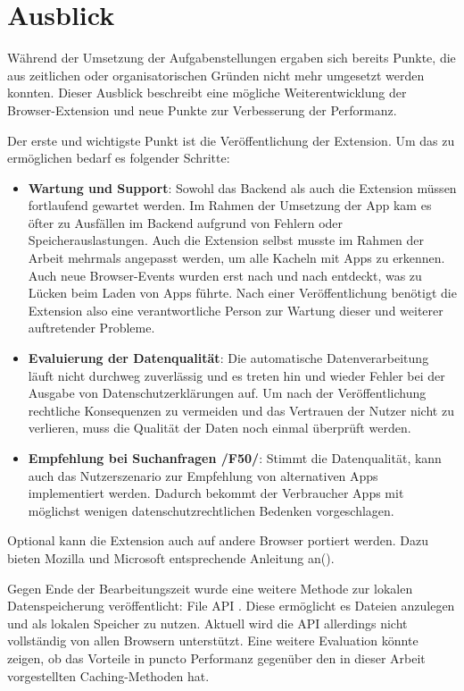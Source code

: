 \section{Ausblick}
\label{s:ausblick}

Während der Umsetzung der Aufgabenstellungen ergaben sich bereits Punkte, die aus zeitlichen oder organisatorischen Gründen nicht mehr umgesetzt werden konnten. Dieser Ausblick beschreibt eine mögliche Weiterentwicklung der Browser-Extension und neue Punkte zur Verbesserung der Performanz.

Der erste und wichtigste Punkt ist die Veröffentlichung der Extension. Um das zu ermöglichen bedarf es folgender Schritte:

\begin{itemize}
	\item \textbf{Wartung und Support}:
	Sowohl das Backend als auch die Extension müssen fortlaufend gewartet werden. Im Rahmen der Umsetzung der App kam es öfter zu Ausfällen im Backend aufgrund von Fehlern oder Speicherauslastungen. Auch die Extension selbst musste im Rahmen der Arbeit mehrmals angepasst werden, um alle Kacheln mit Apps zu erkennen. Auch neue Browser-Events wurden erst nach und nach entdeckt, was zu Lücken beim Laden von Apps führte. Nach einer Veröffentlichung benötigt die Extension also eine verantwortliche Person zur Wartung dieser und weiterer auftretender Probleme.
	\item \textbf{Evaluierung der Datenqualität}:
	Die automatische Datenverarbeitung läuft nicht durchweg zuverlässig und es treten hin und wieder Fehler bei der Ausgabe von Datenschutzerklärungen auf. Um nach der Veröffentlichung rechtliche Konsequenzen zu vermeiden und das Vertrauen der Nutzer nicht zu verlieren, muss die Qualität der Daten noch einmal überprüft werden.
	\item \textbf{Empfehlung bei Suchanfragen /F50/}:
	Stimmt die Datenqualität, kann auch das Nutzerszenario zur Empfehlung von alternativen Apps implementiert werden. Dadurch bekommt der Verbraucher Apps mit möglichst wenigen datenschutzrechtlichen Bedenken vorgeschlagen.
\end{itemize}

Optional kann die Extension auch auf andere Browser portiert werden. Dazu bieten Mozilla und Microsoft entsprechende Anleitung an(\cite{mozilla,edge}).

Gegen Ende der Bearbeitungszeit wurde eine weitere Methode zur lokalen Datenspeicherung veröffentlicht: \glqq File API \grqq{}\cite{file}.
Diese ermöglicht es Dateien anzulegen und als lokalen Speicher zu nutzen. Aktuell wird die API allerdings nicht vollständig von allen Browsern unterstützt. Eine weitere Evaluation könnte zeigen, ob das Vorteile in puncto Performanz gegenüber den in dieser Arbeit vorgestellten Caching-Methoden hat. 

